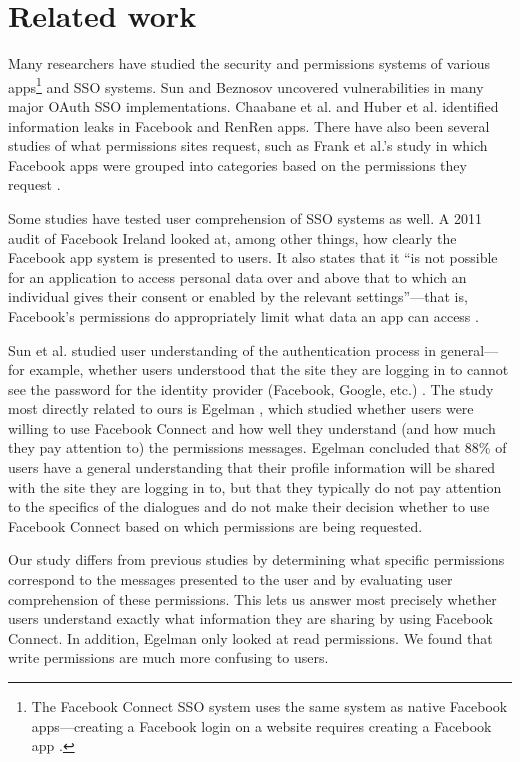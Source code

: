 \documentclass{sig-alternate}
\begin{document}
\section{Related work}
\label{sec:research}

Many researchers have studied the security and permissions systems of various apps\footnote{The Facebook Connect SSO system uses the same system as native Facebook apps---creating a Facebook login on a website requires creating a Facebook app \cite{fbexample}.} and SSO systems. Sun and Beznosov \cite{devildetails} uncovered vulnerabilities in many major OAuth SSO implementations. Chaabane et al. \cite{chaabane} and Huber et al. \cite{appinspect} identified information leaks in Facebook and RenRen apps. There have also been several studies of what permissions sites request, such as Frank et al.'s study in which Facebook apps were grouped into categories based on the permissions they request \cite{miningpermissions}.

Some studies have tested user comprehension of SSO systems as well. A 2011 audit of Facebook Ireland looked at, among other things, how clearly the Facebook app system is presented to users. It also states that it ``is not possible for an application to access personal data over and above that to which an individual gives their consent or enabled by the relevant settings''---that is, Facebook's permissions do appropriately limit what data an app can access \cite{irishaudit}.

Sun et al. studied user understanding of the authentication process in general---for example, whether users understood that the site they are logging in to cannot see the password for the identity provider (Facebook, Google, etc.) \cite{ssoperspective}. The study most directly related to ours is Egelman \cite{egelman}, which studied whether users were willing to use Facebook Connect and how well they understand (and how much they pay attention to) the permissions messages. Egelman concluded that 88\% of users have a general understanding that their profile information will be shared with the site they are logging in to, but that they typically do not pay attention to the specifics of the dialogues and do not make their decision whether to use Facebook Connect based on which permissions are being requested.

Our study differs from previous studies by determining what specific permissions correspond to the messages presented to the user and by evaluating user comprehension of these permissions. This lets us answer most precisely whether users understand exactly what information they are sharing by using Facebook Connect. In addition, Egelman only looked at read permissions. We found that write permissions are much more confusing to users.
\end{document}
